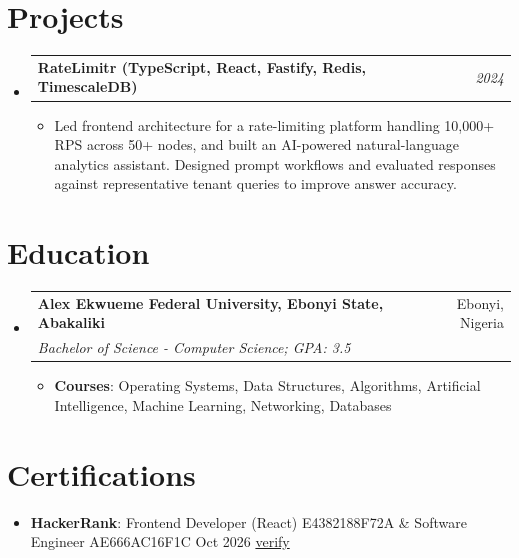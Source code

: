 \documentclass[a4paper]{article}
\makeatletter
\newcommand{\resumeItem}[2]{ \item\small{ \textbf{#1}: #2 } }
\newcommand{\resumeSubheading}[4]{
\vspace{-1pt}
\item[]
\begin{tabular*}{0.97\textwidth}{l@{\extracolsep{\fill}}r}
	\textbf{#1} & #2          \\
	\textit{#3} & \textit{#4} \\
\end{tabular*}
\vspace{1pt}
}
\newcommand{\resumeProjectHeading}[2]{ %
\vspace{2pt}
\item[]
\begin{tabular*}{0.97\textwidth}{l@{\extracolsep{\fill}}r}
	\textbf{#1} & \textit{#2} \\
\end{tabular*}
\vspace{0pt}
}
\newcommand{\resumeSubItem}[2]{\resumeItem{#1}{#2}
\vspace{-8pt}}
\newcommand{\resumeSubHeadingListStart}{\begin{itemize}[leftmargin=*,topsep=1pt]}
\newcommand{\resumeSubHeadingListEnd}{\end{itemize}}
\newcommand{\resumeItemListStart}{\begin{itemize}[topsep=0pt,itemsep=0pt,parsep=0pt]}
\newcommand{\resumeItemListEnd}{\end{itemize}}
\makeatother
\begin{document}
	\section{Projects}
	\resumeSubHeadingListStart
	\resumeProjectHeading{RateLimitr (TypeScript, React, Fastify, Redis, TimescaleDB)}{2024}
	\resumeItemListStart
	\item\small{Led frontend architecture for a rate-limiting platform handling 10,000+ RPS across 50+ nodes, and built an AI-powered natural-language analytics assistant. Designed prompt workflows and evaluated responses against representative tenant queries to improve answer accuracy.}
	\resumeItemListEnd
	\resumeSubHeadingListEnd

	\section{Education}
	\resumeSubHeadingListStart
	\resumeSubheading
	{Alex Ekwueme Federal University, Ebonyi State, Abakaliki}{Ebonyi, Nigeria}
	{Bachelor of Science - Computer Science; GPA: 3.5}{}
	\resumeItemListStart
	\resumeItem{Courses}{Operating Systems, Data Structures, Algorithms, Artificial Intelligence, Machine Learning, Networking, Databases}
	\resumeItemListEnd
	\resumeSubHeadingListEnd

	\section{Certifications}
	\resumeSubHeadingListStart
	\resumeSubItem{HackerRank}{Frontend Developer (React) \textbullet{} E4382188F72A \& Software Engineer \textbullet{} AE666AC16F1C \textbullet{} Oct 2026 \textbullet{} \href{https://www.hackerrank.com/certificates/e4382188f72a}{verify}}
	\resumeSubHeadingListEnd
\end{document}
